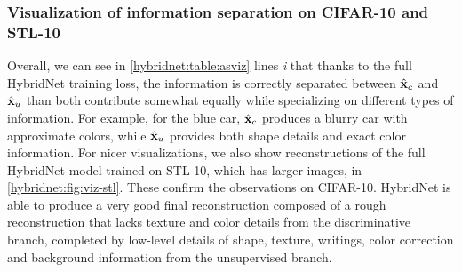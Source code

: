 \subsubsection{Visualization of information separation on CIFAR-10 and STL-10}


Overall, we can see in \autoref{hybridnet:table:asviz} lines \textit{i} that thanks to the full HybridNet training loss, the information is correctly separated between $\hat{\mathbf{x}}_c$ and $\hat{\mathbf{x}}_u$ than both contribute somewhat equally while specializing on different types of information. For example, for the blue car, $\hat{\mathbf{x}}_c$ produces a blurry car with approximate colors, while $\hat{\mathbf{x}}_u$ provides both shape details and exact color information. For nicer visualizations, we also show reconstructions of the full HybridNet model trained on STL-10, which has larger images, in \autoref{hybridnet:fig:viz-stl}. These confirm the observations on CIFAR-10. HybridNet is able to produce a very good final reconstruction composed of a rough reconstruction that lacks texture and color details from the discriminative branch, completed by low-level details of shape, texture, writings, color correction and background information from the unsupervised branch.



